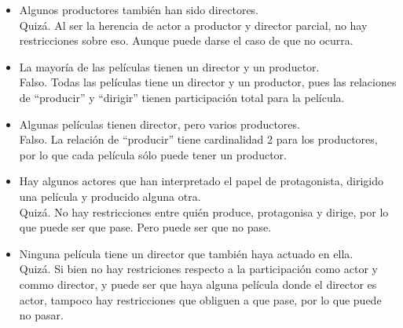 \documentclass{article}
\begin{document}
\begin{itemize}
{        }
        \item {
            Algunos productores también han sido directores. \\
            Quizá. Al ser la herencia de actor a productor y director parcial, 
            no hay restricciones sobre eso. Aunque puede darse el caso de que no 
            ocurra.
        }
        \item {
            La mayoría de las películas tienen un director y un productor. \\
            Falso. Todas las películas tiene un director y un productor, pues 
            las relaciones de ``producir'' y ``dirigir'' tienen participación 
            total para la película.
        }
        \item {
            Algunas películas tienen director, pero varios productores. \\
            Falso. La relación de ``producir'' tiene cardinalidad 2 para los 
            productores, por lo que cada película sólo puede tener un productor.
        }
        \item {
            Hay algunos actores que han interpretado el papel de protagonista, 
            dirigido una película y producido alguna otra. \\
            Quizá. No hay restricciones entre quién produce, protagonisa y 
            dirige, por lo que puede ser que pase. Pero puede ser que no pase.
        }
        \item {
            Ninguna película tiene un director que también haya actuado en ella.\\
            Quizá. Si bien no hay restriciones respecto a la participación como 
            actor y commo director, y puede ser que haya alguna película donde 
            el director es actor, tampoco hay restricciones que obliguen a que 
            pase, por lo que puede no pasar.
        }
    \end{itemize}
\end{document}
